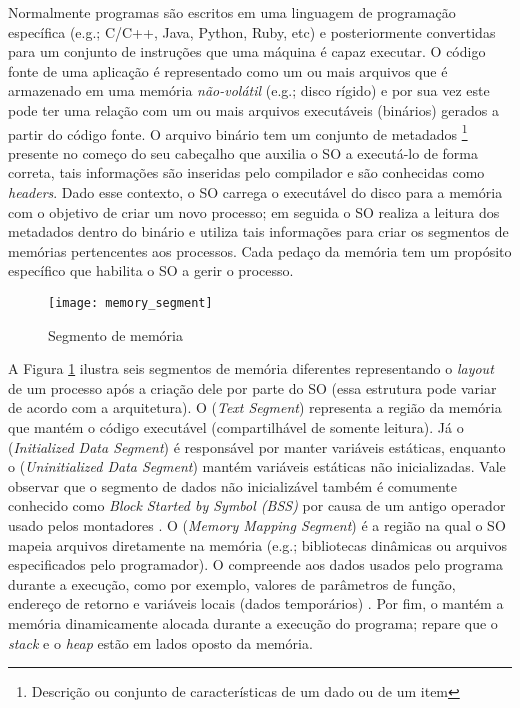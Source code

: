 Normalmente programas são escritos em uma linguagem de programação específica
(e.g.; C/C++, Java, Python, Ruby, etc) e posteriormente convertidas para um
conjunto de instruções que uma máquina é capaz executar. O código fonte de uma
aplicação é representado como um ou mais arquivos que é armazenado em uma
memória \emph{não-volátil} (e.g.; disco rígido) e por sua vez este pode ter uma
relação com um ou mais arquivos executáveis (binários) gerados a partir do
código fonte. O arquivo binário tem um conjunto de metadados
\footnote{Descrição ou conjunto de características de um dado ou de um item}
presente no começo do seu cabeçalho que auxilia o SO a executá-lo de forma
correta, tais informações são inseridas pelo compilador e são conhecidas como
\emph{headers}.  Dado esse contexto, o SO carrega o executável do disco para a
memória com o objetivo de criar um novo processo; em seguida o SO realiza a
leitura dos metadados dentro do binário e utiliza tais informações para criar
os segmentos de memórias pertencentes aos processos. Cada pedaço da memória tem
um propósito específico que habilita o SO a gerir o processo.

\begin{figure}[!h]
  \centering
  \texttt{[image: memory\_segment]} 
  \caption{Segmento de memória}
  \label{fig:memory_segment} 
\end{figure}

A Figura \ref{fig:memory_segment} ilustra seis segmentos de memória diferentes
representando o \emph{layout} de um processo após a criação dele por parte do
SO (essa estrutura pode variar de acordo com a arquitetura). O
 (\emph{Text Segment}) representa a região da
memória que mantém o código executável (compartilhável de somente leitura). Já
o  (\emph{Initialized Data
Segment}) é responsável por manter variáveis estáticas, enquanto o
 (\emph{Uninitialized Data
Segment}) mantém variáveis estáticas não inicializadas.  Vale observar que o
segmento de dados não inicializável também é comumente conhecido como
\emph{Block Started by Symbol (BSS)} por causa de um antigo operador usado
pelos montadores \citep{gdb}. O  (\emph{Memory Mapping Segment}) é a região na qual o SO mapeia
arquivos diretamente na memória (e.g.; bibliotecas dinâmicas ou arquivos
especificados pelo programador). O  compreende
aos dados usados pelo programa durante a execução, como por exemplo, valores de
parâmetros de função, endereço de retorno e variáveis locais (dados
temporários) \citep{silberschatz}.  Por fim, o 
mantém a memória dinamicamente alocada durante a execução do programa; repare
que o \emph{stack} e o \emph{heap} estão em lados oposto da memória.

